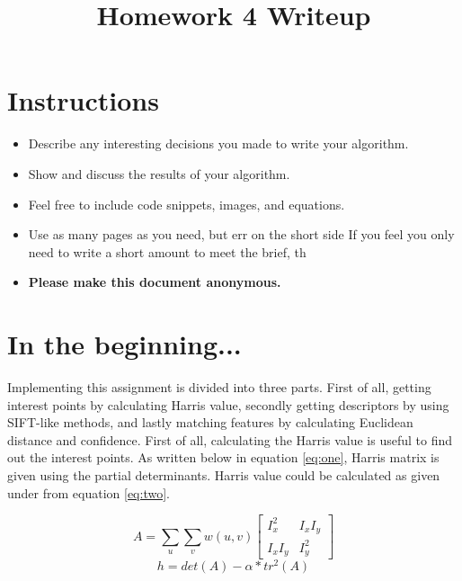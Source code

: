 \date{}

\title{\vspace{-1cm}Homework 4 Writeup}



\maketitle
\vspace{-3cm}
\thispagestyle{fancy}

\section*{Instructions}
\begin{itemize}
  \item Describe any interesting decisions you made to write your algorithm.
  \item Show and discuss the results of your algorithm.
  \item Feel free to include code snippets, images, and equations.
  \item Use as many pages as you need, but err on the short side If you feel you only need to write a short amount to meet the brief, th
  
  \item \textbf{Please make this document anonymous.}
\end{itemize}

\section*{In the beginning...}

Implementing this assignment is divided into three parts. First of all, getting interest points by calculating Harris value, secondly getting descriptors by using SIFT-like methods, and lastly matching features by calculating Euclidean distance and confidence. 
First of all, calculating the Harris value is useful to find out the interest points. As written below in equation \ref{eq:one}, Harris matrix is given using the partial determinants. Harris value could be calculated as given under from equation \ref{eq:two}. 

\begin{equation}
A = \sum_{u} \sum_{v} w(u,v) 
    \begin{bmatrix}     I_x^2 & I_xI_y \\         I_xI_y & I_y^2     \end{bmatrix} 
\label{eq:one}
\end{equation}
\begin{equation}
h = det(A) - \alpha * tr^2(A)
\label{eq:two}
\end{equation}

